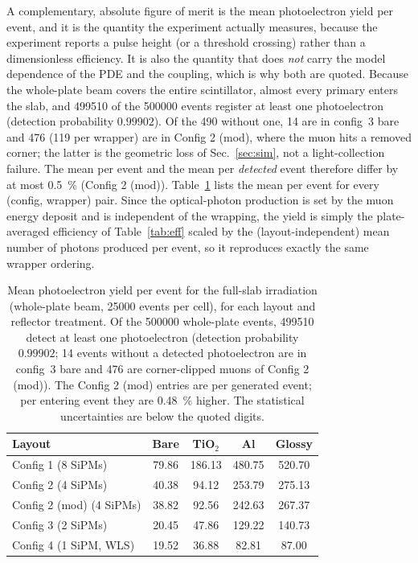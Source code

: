 \documentclass[11pt,a4paper]{article}
\begin{document}
A complementary, absolute figure of merit is the mean photoelectron yield per
event, and it is the quantity the experiment actually measures, because the
experiment reports a pulse height (or a threshold crossing) rather than a
dimensionless efficiency. It is also the quantity that does \emph{not} carry
the model dependence of the PDE and the coupling, which is why both are quoted.
Because the whole-plate beam covers the entire scintillator, almost every
primary enters the slab, and \num{499510} of the \num{500000} events
register at least one photoelectron (detection probability $0.99902$).
Of the 490 without one, 14 are in config~3 bare and 476 (119 per wrapper) are
in Config 2 (mod), where the muon hits a removed corner; the latter is the
geometric loss of Sec.~\ref{sec:sim}, not a light-collection failure. The mean
per event and the mean per \emph{detected} event therefore differ by at most
\SI{0.5}{\percent} (Config 2 (mod)).
Table~\ref{tab:wholeyield} lists the mean per event for every (config, wrapper)
pair.
Since the optical-photon production is set by the muon energy deposit and is
independent of the wrapping, the yield is simply the plate-averaged efficiency
of Table~\ref{tab:eff} scaled by the (layout-independent) mean number of photons
produced per event, so it reproduces exactly the same wrapper ordering.

\begin{table}[H]
\centering
\caption{Mean photoelectron yield per event for the full-slab irradiation
(whole-plate beam, \num{25000} events per cell), for each layout and reflector
treatment. Of the \num{500000} whole-plate events, \num{499510} detect at least
one photoelectron (detection probability $0.99902$; 14 events without a
detected photoelectron are in config~3 bare and 476 are corner-clipped muons
of Config 2 (mod)). The Config 2 (mod) entries are per generated event; per
entering event they are \SI{0.48}{\percent} higher. The statistical
uncertainties are below the quoted digits.}
\label{tab:wholeyield}
\small
\begin{tabular}{@{}lcccc@{}}
\toprule
Layout & Bare & TiO$_2$ & Al & Glossy \\
\midrule
Config 1 (8 SiPMs)     & 79.86 & 186.13 & 480.75 & 520.70 \\
Config 2 (4 SiPMs)     & 40.38 & 94.12  & 253.79 & 275.13 \\
Config 2 (mod) (4 SiPMs) & 38.82 & 92.56 & 242.63 & 267.37 \\
Config 3 (2 SiPMs)     & 20.45 & 47.86  & 129.22 & 140.73 \\
Config 4 (1 SiPM, WLS) & 19.52 & 36.88  & 82.81  & 87.00 \\
\bottomrule
\end{tabular}
\end{table}
\end{document}
